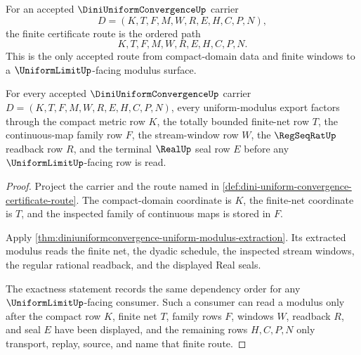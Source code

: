 \begin{definition}
\label{def:dini-uniform-convergence-certificate-route}
For an accepted $\DiniUniformConvergenceUp$ carrier
$$
D=(K,T,F,M,W,R,E,H,C,P,N),
$$
the finite certificate route is the ordered path
$$
K,T,F,M,W,R,E,H,C,P,N.
$$
This is the only accepted route from compact-domain data and finite windows to a $\UniformLimitUp$-facing modulus surface.
\end{definition}

\begin{theorem}
\label{thm:dini-uniform-convergence-compact-window-exactness}
For every accepted $\DiniUniformConvergenceUp$ carrier $D=(K,T,F,M,W,R,E,H,C,P,N)$, every uniform-modulus export factors through the compact metric row $K$, the totally bounded finite-net row $T$, the continuous-map family row $F$, the stream-window row $W$, the $\RegSeqRatUp$ readback row $R$, and the terminal $\RealUp$ seal row $E$ before any $\UniformLimitUp$-facing row is read.
\end{theorem}
\begin{proof}
Project the carrier and the route named in \autoref{def:dini-uniform-convergence-certificate-route}. The compact-domain coordinate is $K$, the finite-net coordinate is $T$, and the inspected family of continuous maps is stored in $F$.

Apply \autoref{thm:diniuniformconvergence-uniform-modulus-extraction}. Its extracted modulus reads the finite net, the dyadic schedule, the inspected stream windows, the regular rational readback, and the displayed Real seals.

The exactness statement records the same dependency order for any $\UniformLimitUp$-facing consumer. Such a consumer can read a modulus only after the compact row $K$, finite net $T$, family rows $F$, windows $W$, readback $R$, and seal $E$ have been displayed, and the remaining rows $H,C,P,N$ only transport, replay, source, and name that finite route.
\end{proof}

